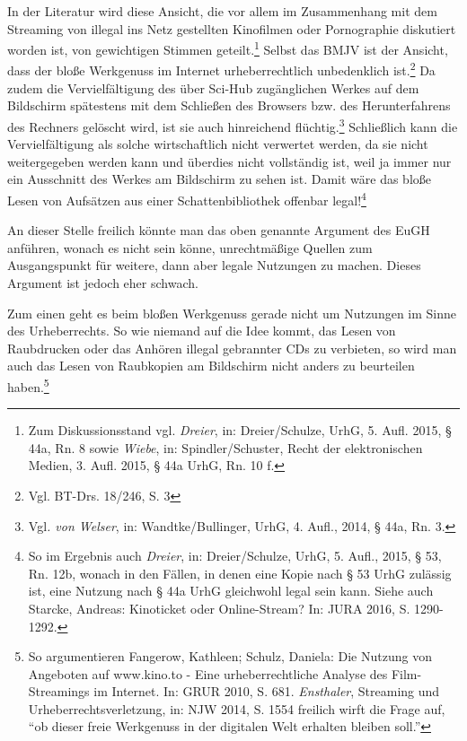 \documentclass[a4paper,
fontsize=11pt,
oneside,
numbers=noperiodatend,
parskip=half-,
bibliography=totoc,
final
]{scrartcl}
\begin{document}
In der Literatur wird diese Ansicht, die vor allem im Zusammenhang mit
dem Streaming von illegal ins Netz gestellten Kinofilmen oder
Pornographie diskutiert worden ist, von gewichtigen Stimmen
geteilt.\footnote{Zum Diskussionsstand vgl. \emph{Dreier}, in:
  Dreier/Schulze, UrhG, 5. Aufl. 2015, § 44a, Rn. 8 sowie \emph{Wiebe},
  in: Spindler/Schuster, Recht der elektronischen Medien, 3. Aufl. 2015,
  § 44a UrhG, Rn. 10 f.} Selbst das BMJV ist der Ansicht, dass der bloße
Werkgenuss im Internet urheberrechtlich unbedenklich ist.\footnote{Vgl.
  BT-Drs. 18/246, S. 3} Da zudem die Vervielfältigung des über Sci-Hub
zugänglichen Werkes auf dem Bildschirm spätestens mit dem Schließen des
Browsers bzw. des Herunterfahrens des Rechners gelöscht wird, ist sie
auch hinreichend flüchtig.\footnote{Vgl\emph{. von Welser}, in:
  Wandtke/Bullinger, UrhG, 4. Aufl., 2014, § 44a, Rn. 3.} Schließlich
kann die Vervielfältigung als solche wirtschaftlich nicht verwertet
werden, da sie nicht weitergegeben werden kann und überdies nicht
vollständig ist, weil ja immer nur ein Ausschnitt des Werkes am
Bildschirm zu sehen ist. Damit wäre das bloße Lesen von Aufsätzen aus
einer Schattenbibliothek offenbar legal!\footnote{So im Ergebnis auch
  \emph{Dreier}, in: Dreier/Schulze, UrhG, 5. Aufl., 2015, § 53, Rn.
  12b, wonach in den Fällen, in denen eine Kopie nach § 53 UrhG zulässig
  ist, eine Nutzung nach § 44a UrhG gleichwohl legal sein kann. Siehe
  auch Starcke, Andreas: Kinoticket oder Online-Stream? In: JURA 2016,
  S. 1290-1292.}

An dieser Stelle freilich könnte man das oben genannte Argument des EuGH
anführen, wonach es nicht sein könne, unrechtmäßige Quellen zum
Ausgangspunkt für weitere, dann aber legale Nutzungen zu machen. Dieses
Argument ist jedoch eher schwach.

Zum einen geht es beim bloßen Werkgenuss gerade nicht um Nutzungen im
Sinne des Urheberrechts. So wie niemand auf die Idee kommt, das Lesen
von Raubdrucken oder das Anhören illegal gebrannter CDs zu verbieten, so
wird man auch das Lesen von Raubkopien am Bildschirm nicht anders zu
beurteilen haben.\footnote{So argumentieren Fangerow, Kathleen; Schulz,
  Daniela: Die Nutzung von Angeboten auf www.kino.to - Eine
  urheberrechtliche Analyse des Film-Streamings im Internet. In: GRUR
  2010, S. 681. \emph{Ensthaler}, Streaming und Urheberrechtsverletzung,
  in: NJW 2014, S. 1554 freilich wirft die Frage auf, \enquote{ob dieser
  freie Werkgenuss in der digitalen Welt erhalten bleiben soll.}}
\end{document}
